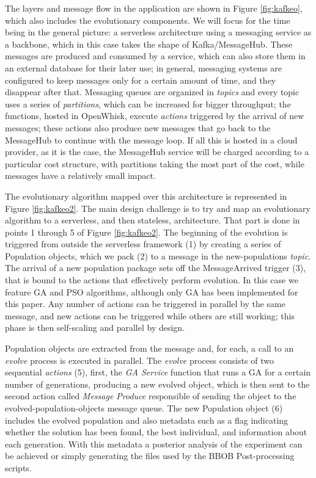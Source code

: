 \documentclass{llncs}
\begin{document}
  The layers and message flow in the application are shown in Figure
  \ref{fig:kafkeo}, which also includes the evolutionary components. We
  will focus for the time being in the general picture: a serverless
  architecture using  a messaging service as a backbone, which in this case
  takes the shape of Kafka/MessageHub. These messages are produced and
  consumed by a service, which can also store them in an external database
  for their later use; in general, messaging systems are configured to
  keep messages only for a certain amount of time, and they disappear
  after that. Messaging queues are organized in {\em topics} and every
  topic uses a series of {\em partitions}, which can be increased for
  bigger throughput; the
  functions, hosted in OpenWhisk, execute {\em actions} triggered by the
  arrival of new messages; these actions also produce new messages that
  go back to the MessageHub to continue with the message loop. If all
  this is hosted in a cloud provider, as it is the case, the MessageHub
  service will be charged according to a particular cost
  structure, with partitions taking the most part of
  the cost, while messages have a relatively small impact.

  The evolutionary algorithm mapped over this architecture is 
  represented in Figure \ref{fig:kafkeo2}. The main
  design challenge is to try and map an evolutionary algorithm to a
  serverless, and then stateless, architecture. That part is done in
  points 1 through 5 of Figure \ref{fig:kafkeo2}. The beginning of the
  evolution is triggered from outside the serverless framework (1) by
  creating a series of Population objects, which we pack (2) to a message in the
  {\sf new-populations} {\em topic}. The arrival of a new population
  package sets off the {\sf MessageArrived} trigger (3), that is bound to
  the actions that effectively perform evolution. In this case we
  feature GA and PSO algorithms, although only GA has been implemented 
  for this paper. Any number of actions can be triggered in parallel by the same message,
  and new actions can be triggered while others are still working; this phase is
  then self-scaling and parallel by design.

  Population objects are extracted from the message and, for each, a call to
  an {\em evolve} process is executed in parallel. The {\em evolve} process
  consists of two sequential {\em actions} (5), first, the {\em GA Service} function that
  runs a GA for a certain number of generations, producing a new evolved
  object, which is then sent to the second action called {\em Message Produce}
   responsible of sending the object to the {\sf evolved-population-objects} 
   message queue.  The new Population object (6) includes
   the evolved population and also metadata such as a flag indicating
  whether the solution has been found, the best individual, and information
  about each generation. With this metadata a posterior analysis of the experiment
  can be achieved or simply generating the files used by the BBOB Post-processing scripts.
\end{document}
